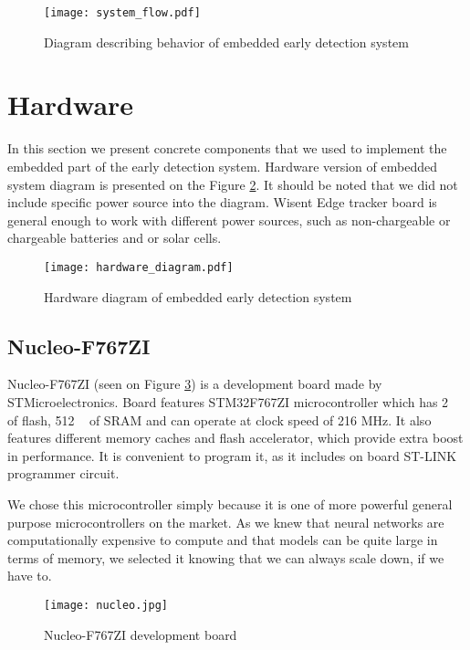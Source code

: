 \begin{figure}[ht]
        \centering
        \texttt{[image: system\_flow.pdf]} 
        \caption{ Diagram describing behavior of embedded early detection system} 
        \label{system_flow}
\end{figure}


\section{ Hardware}

In this section we present concrete components that we used to implement the embedded part of the early detection system.
Hardware version of embedded system diagram is presented on the Figure \ref{hardware_diagram}.
It should be noted that we did not include specific power source into the diagram.
Wisent Edge tracker board is general enough to work with different power sources, such as non-chargeable or chargeable batteries and or solar cells.

\begin{figure}[ht]
        \centering
        \texttt{[image: hardware\_diagram.pdf]} 
        \caption{ Hardware diagram of embedded early detection system} 
        \label{hardware_diagram}
\end{figure}

\subsection{ Nucleo-F767ZI}

Nucleo-F767ZI (seen on Figure \ref{nucleo}) is a development board made by STMicroelectronics.
Board features STM32F767ZI microcontroller which has 2 \si{\mega\byte} of flash, 512 \si{\kilo\byte} of SRAM and can operate at clock speed of 216 \si{\mega\hertz}.
It also features different memory caches and flash accelerator, which provide extra boost in performance.
It is convenient to program it, as it includes on board ST-LINK programmer circuit.

We chose this microcontroller simply because it is one of more powerful general purpose microcontrollers on the market.
As we knew that neural networks are computationally expensive to compute and that models can be quite large in terms of memory, we selected it knowing that we can always scale down, if we have to.

\begin{figure}[ht]
        \centering
        \texttt{[image: nucleo.jpg]} 
        \caption{ Nucleo-F767ZI development board} 
        \label{nucleo}
\end{figure}



